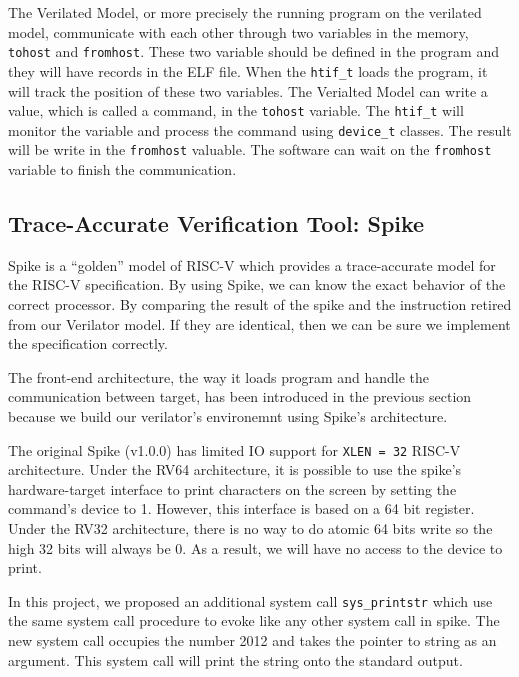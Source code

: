 The Verilated Model, or more precisely the running program on the verilated model, communicate with each other through two variables in the memory, \texttt{tohost} and \texttt{fromhost}. These two variable should be defined in the program and they will have records in the ELF file. When the \texttt{htif\_t} loads the program, it will track the position of these two variables. The Verialted Model can write a value, which is called a command, in the \texttt{tohost} variable. The \texttt{htif\_t} will monitor the variable and process the command using \texttt{device\_t} classes. The result will be write in the \texttt{fromhost} valuable. The software can wait on the \texttt{fromhost} variable to finish the communication.

\subsection{Trace-Accurate Verification Tool: Spike} %

Spike is a ``golden'' model of RISC-V which provides a trace-accurate model for the RISC-V specification. By using Spike, we can know the exact behavior of the correct processor. By comparing the result of the spike and the instruction retired from our Verilator model. If they are identical, then we can be sure we implement the specification correctly.

The front-end architecture, the way it loads program and handle the communication between target, has been introduced in the previous section because we build our verilator's environemnt using Spike's architecture.

The original Spike (v1.0.0) has limited IO support for \texttt{XLEN = 32} RISC-V architecture. Under the RV64 architecture, it is possible to use the spike's hardware-target interface to print characters on the screen by setting the command's device to 1. However, this interface is based on a 64 bit register. Under the RV32 architecture, there is no way to do atomic 64 bits write so the high 32 bits will always be 0. As a result, we will have no access to the device to print.

In this project, we proposed an additional system call \texttt{sys\_printstr} which use the same system call procedure to evoke like any other system call in spike. The new system call occupies the number 2012 and takes the pointer to string as an argument. This system call will print the string onto the standard output.

